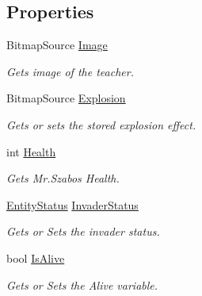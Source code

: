 \subsection*{Properties}
\begin{DoxyCompactItemize}
\item 
Bitmap\+Source \mbox{\hyperlink{class_o_e_invaders_1_1_library_1_1_szabo_a686b99bc4e7391aaa4004e1d39248965}{Image}}
\begin{DoxyCompactList}\small\item\em Gets image of the teacher. \end{DoxyCompactList}\item 
Bitmap\+Source \mbox{\hyperlink{class_o_e_invaders_1_1_library_1_1_szabo_a0428c4e03be0003f7bb79d93bfb27e5f}{Explosion}}
\begin{DoxyCompactList}\small\item\em Gets or sets the stored explosion effect. \end{DoxyCompactList}\item 
int \mbox{\hyperlink{class_o_e_invaders_1_1_library_1_1_szabo_a29379f67ce386b485b79c64103cd1853}{Health}}
\begin{DoxyCompactList}\small\item\em Gets Mr.\+Szabo\textquotesingle{}s Health. \end{DoxyCompactList}\item 
\mbox{\hyperlink{namespace_o_e_invaders_1_1_library_a31b94a15c65f6baa474008cdade6bdea}{Entity\+Status}} \mbox{\hyperlink{class_o_e_invaders_1_1_library_1_1_szabo_a4fdc782b58d7b0846b15be7dce584301}{Invader\+Status}}
\begin{DoxyCompactList}\small\item\em Gets or Sets the invader status. \end{DoxyCompactList}\item 
bool \mbox{\hyperlink{class_o_e_invaders_1_1_library_1_1_szabo_a8010f569f47f528aa15b28bf5afce24a}{Is\+Alive}}
\begin{DoxyCompactList}\small\item\em Gets or Sets the Alive variable. \end{DoxyCompactList}\item 

\end{DoxyCompactItemize}
